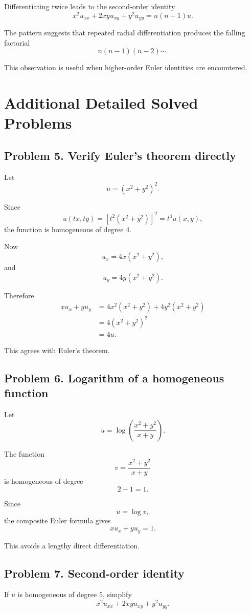 \documentclass[11pt,oneside]{book}
\theoremstyle{studentthm}
\theoremstyle{definition}
\begin{document}
Differentiating twice leads to the second-order identity
\[
x^2u_{xx}
+
2xyu_{xy}
+
y^2u_{yy}
=
n(n-1)u.
\]

The pattern suggests that repeated radial differentiation produces the
falling factorial
\[
n(n-1)(n-2)\cdots.
\]

This observation is useful when higher-order Euler identities are
encountered.

\section{Additional Detailed Solved Problems}

\subsection*{Problem 5. Verify Euler's theorem directly}

Let
\[
u=(x^2+y^2)^2.
\]

Since
\[
u(tx,ty)
=
[t^2(x^2+y^2)]^2
=
t^4u(x,y),
\]
the function is homogeneous of degree \(4\).

Now
\[
u_x
=
4x(x^2+y^2),
\]
and
\[
u_y
=
4y(x^2+y^2).
\]

Therefore
\[
\begin{aligned}
xu_x+yu_y
&=
4x^2(x^2+y^2)
+
4y^2(x^2+y^2)\\
&=
4(x^2+y^2)^2\\
&=
4u.
\end{aligned}
\]

This agrees with Euler's theorem.

\subsection*{Problem 6. Logarithm of a homogeneous function}

Let
\[
u
=
\log\left(\frac{x^2+y^2}{x+y}\right).
\]

The function
\[
v=
\frac{x^2+y^2}{x+y}
\]
is homogeneous of degree
\[
2-1=1.
\]

Since
\[
u=\log v,
\]
the composite Euler formula gives
\[
xu_x+yu_y=1.
\]

This avoids a lengthy direct differentiation.

\subsection*{Problem 7. Second-order identity}

If \(u\) is homogeneous of degree \(5\), simplify
\[
x^2u_{xx}+2xyu_{xy}+y^2u_{yy}.
\]
\end{document}
